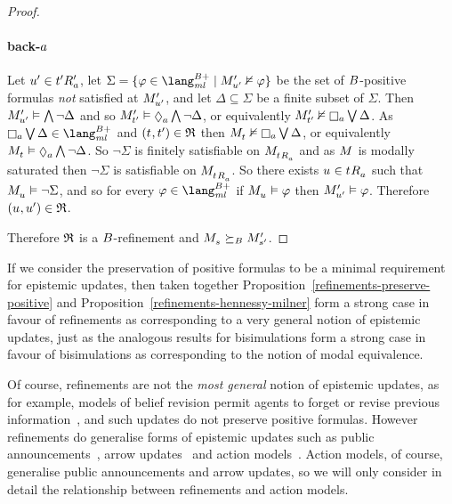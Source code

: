 \begin{proof}
\paragraph{back-$a$}
Let ${u}^{\prime} \in {{t}^{\prime}} {R^{\prime}_{a}}$, let $\Sigma = \{\phi \in \langMlPlusBs \mid \kPModelP{\kStateUP} \nentails \phi\}$ be the set of $B$-positive formulas {\em not} satisfied at ${M^{\prime}_{{u}^{\prime}}}$, and let $\Delta \subseteq \Sigma$ be a finite subset of $\Sigma$.
Then ${M^{\prime}_{{u}^{\prime}}} \vDash \bigwedge \lnot \Delta$ and so $\kPModelP{\kStateTP} \entails \possibleA \bigwedge \lnot \Delta$, or equivalently $\kPModelP{\kStateTP} \nentails \necessaryA \bigvee \Delta$.
As $\necessaryA \bigvee \Delta \in \langMlPlusBs$ and $(\kStateT, \kStateTP) \in \refinement$ then $\kPModel{\kStateT} \nentails \necessaryA \bigvee \Delta$, or equivalently $\kPModel{\kStateT} \entails \possibleA \bigwedge \lnot \Delta$.
So $\lnot \Sigma$ is finitely satisfiable on $\kPModel{\kSuccessorsA{\kStateT}}$ and as $\kModel$ is modally saturated then $\lnot \Sigma$ is satisfiable on $\kPModel{\kSuccessorsA{\kStateT}}$.
So there exists $\kStateU \in \kSuccessorsA{\kStateT}$ such that $\kPModel{\kStateU} \entails \lnot \Sigma$, and so for every $\phi \in \langMlPlusBs$ if $\kPModel{\kStateU} \entails \phi$ then ${M^{\prime}_{{u}^{\prime}}} \vDash \varphi$.
Therefore $(\kStateU, \kStateUP) \in \refinement$.

Therefore $\mathfrak{R}$ is a $B$-refinement and $\kPModel{\kStateS} \simulatesBs \kPModelP{\kStateSP}$.
\end{proof}

If we consider the preservation of positive formulas to be a minimal requirement for epistemic updates, then taken together Proposition~\ref{refinements-preserve-positive} and Proposition~\ref{refinements-hennessy-milner} form a strong case in favour of refinements as corresponding to a very general notion of epistemic updates, just as the analogous results for bisimulations form a strong case in favour of bisimulations as corresponding to the notion of modal equivalence.

Of course, refinements are not the {\em most general} notion of epistemic updates, as for example, models of belief revision permit agents to forget or revise previous information~\cite{alchourron:1985}, and such updates do not preserve positive formulas.
However refinements do generalise forms of epistemic updates such as public announcements~\cite{plaza:1989,gerbrandy:1997}, arrow updates~\cite{kooi:2011a} and action models~\cite{baltag:1999, baltag:2004}.
Action models, of course, generalise public announcements and arrow updates, so we will only consider in detail the relationship between refinements and action models.

